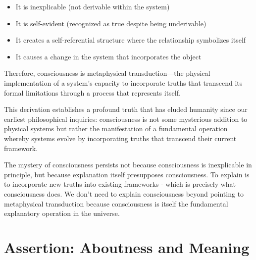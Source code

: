\documentclass[runningheads]{llncs}
\begin{document}
\begin{itemize}
    \item It is inexplicable (not derivable within the system)
    \item It is self-evident (recognized as true despite being underivable)
    \item It creates a self-referential structure where the relationship symbolizes itself
    \item It causes a change in the system that incorporates the object
\end{itemize}

Therefore, consciousness is metaphysical transduction—the physical implementation of a system's capacity to incorporate truths that transcend its formal limitations through a process that represents itself.

This derivation establishes a profound truth that has eluded humanity since our earliest philosophical inquiries: consciousness is not some mysterious addition to physical systems but rather the manifestation of a fundamental operation whereby systems evolve by incorporating truths that transcend their current framework.

The mystery of consciousness persists not because consciousness is inexplicable in principle, but because explanation itself presupposes consciousness. To explain is to incorporate new truths into existing frameworks - which is precisely what consciousness does. We don't need to explain consciousness beyond pointing to metaphysical transduction because consciousness is itself the fundamental explanatory operation in the universe.


\section{Assertion: Aboutness and Meaning}


\end{document}
